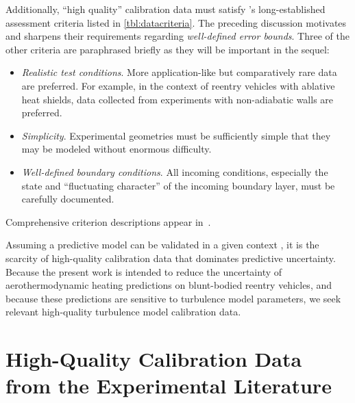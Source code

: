 Additionally, ``high quality'' calibration data must satisfy
\citeauthor{Settles1991Hypersonic}'s long-established assessment criteria
listed in \autoref{tbl:datacriteria}.  The preceding discussion motivates and
sharpens their requirements regarding \emph{well-defined error bounds}.  Three
of the other criteria are paraphrased briefly as they will be important in the
sequel:
\begin{itemize}
  \item \emph{Realistic test conditions}.  More application-like but
   comparatively rare data are preferred.  For example, in the context of
   reentry vehicles with ablative heat shields, data collected from experiments
   with non-adiabatic walls are preferred.
  \item \emph{Simplicity}. Experimental geometries must be sufficiently simple
  that they may be modeled without enormous difficulty.
  \item \emph{Well-defined boundary conditions}.  All incoming conditions,
  especially the state and ``fluctuating character'' of the incoming
  boundary layer, must be carefully documented.
\end{itemize}
Comprehensive criterion descriptions
appear in~\citet{Settles1993Hypersonic}.

Assuming a predictive model can be validated in a given context
\citep{Oden2010ComputerI, Oden2010ComputerII, Moser2012Validating}, it is the
scarcity of high-quality calibration data that dominates predictive uncertainty.
Because the present work is intended to reduce the uncertainty of aerothermodynamic heating predictions
on blunt-bodied reentry vehicles, and because these predictions are sensitive to
turbulence model parameters, we seek relevant high-quality turbulence
model calibration data.



\section[High-Quality Calibration Data from the Experimental Literature]
        {High-Quality Calibration Data\\from the Experimental Literature}

